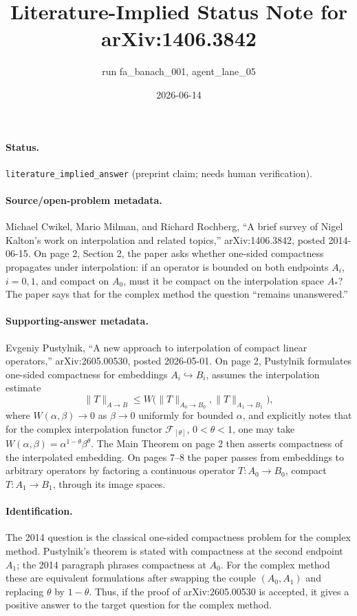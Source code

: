\documentclass[11pt]{article}
\title{Literature-Implied Status Note for arXiv:1406.3842}
\author{run fa\_banach\_001, agent\_lane\_05}
\date{2026-06-14}
\begin{document}
\maketitle

\paragraph{Status.}
\texttt{literature\_implied\_answer} (preprint claim; needs human verification).

\paragraph{Source/open-problem metadata.}
Michael Cwikel, Mario Milman, and Richard Rochberg,
``A brief survey of Nigel Kalton's work on interpolation and related topics,''
arXiv:1406.3842, posted 2014-06-15.
On page 2, Section 2, the paper asks whether one-sided compactness propagates
under interpolation: if an operator is bounded on both endpoints \(A_i\),
\(i=0,1\), and compact on \(A_0\), must it be compact on the interpolation
space \(A_*\)? The paper says that for the complex method the question
``remains unanswered.''

\paragraph{Supporting-answer metadata.}
Evgeniy Pustylnik, ``A new approach to interpolation of compact linear
operators,'' arXiv:2605.00530, posted 2026-05-01. On page 2, Pustylnik
formulates one-sided compactness for embeddings \(A_i\hookrightarrow B_i\),
assumes the interpolation estimate
\[
 \|T\|_{A\to B}\le
 W\bigl(\|T\|_{A_0\to B_0},\|T\|_{A_1\to B_1}\bigr),
\]
where \(W(\alpha,\beta)\to0\) as \(\beta\to0\) uniformly for bounded
\(\alpha\), and explicitly notes that for the complex interpolation functor
\(\mathcal F_{[\theta]}\), \(0<\theta<1\), one may take
\(W(\alpha,\beta)=\alpha^{1-\theta}\beta^\theta\). The Main Theorem on page 2
then asserts compactness of the interpolated embedding. On pages 7--8 the
paper passes from embeddings to arbitrary operators by factoring a continuous
operator \(T:A_0\to B_0\), compact \(T:A_1\to B_1\), through its image spaces.

\paragraph{Identification.}
The 2014 question is the classical one-sided compactness problem for the
complex method. Pustylnik's theorem is stated with compactness at the second
endpoint \(A_1\); the 2014 paragraph phrases compactness at \(A_0\). For the
complex method these are equivalent formulations after swapping the couple
\((A_0,A_1)\) and replacing \(\theta\) by \(1-\theta\). Thus, if the proof of
arXiv:2605.00530 is accepted, it gives a positive answer to the target
question for the complex method.
\end{document}
